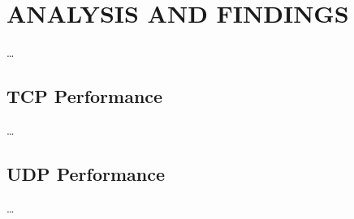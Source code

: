 
\section{ANALYSIS AND FINDINGS} \label{sec:analysis-and-findings}


    \ldots

    \subsection{TCP Performance} \label{subsec:tcp-performance}

        \ldots

    \subsection{UDP Performance} \label{subsec:udp-performance}

        \ldots
